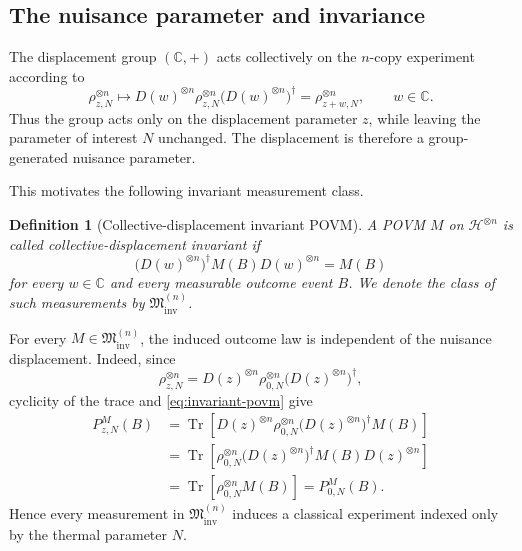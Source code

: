 \documentclass{article}
\newtheorem{definition}{Definition}
\theoremstyle{named}
\theoremstyle{named1}
\newcommand{\Tr}{\operatorname{Tr}}
\newcommand{\bbC}{\mathbb C}
\newcommand{\cM}{\mathfrak M}
\newcommand{\cH}{\mathcal H}
\theoremstyle{plain}
\theoremstyle{remark}
\begin{document}
\subsection{The nuisance parameter and invariance}
\label{subsec:gaussian-symmetry}

The displacement group $(\bbC,+)$ acts collectively on the $n$-copy
experiment according to
\begin{equation}
    \rho_{z,N}^{\otimes n}
    \longmapsto
    D(w)^{\otimes n}
    \rho_{z,N}^{\otimes n}
    \bigl(D(w)^{\otimes n}\bigr)^\dagger
    =
    \rho_{z+w,N}^{\otimes n},
    \qquad
    w\in\bbC.
    \label{eq:collective-displacement-action}
\end{equation}
Thus the group acts only on the displacement parameter $z$, while leaving
the parameter of interest $N$ unchanged. The displacement is therefore a
group-generated nuisance parameter.

This motivates the following invariant measurement class.

\begin{definition}[Collective-displacement invariant POVM]
\label{def:collective-displacement-invariant}
A POVM $M$ on $\cH^{\otimes n}$ is called
\emph{collective-displacement invariant} if
\begin{equation}
    \bigl(D(w)^{\otimes n}\bigr)^\dagger
    M(B)
    D(w)^{\otimes n}
    =
    M(B)
    \label{eq:invariant-povm}
\end{equation}
for every $w\in\bbC$ and every measurable outcome event $B$.
We denote the class of such measurements by
$\cM_{\mathrm{inv}}^{(n)}$.
\end{definition}

For every $M\in\cM_{\mathrm{inv}}^{(n)}$, the induced outcome law is
independent of the nuisance displacement. Indeed, since
\[
    \rho_{z,N}^{\otimes n}
    =
    D(z)^{\otimes n}
    \rho_{0,N}^{\otimes n}
    \bigl(D(z)^{\otimes n}\bigr)^\dagger,
\]
cyclicity of the trace and \eqref{eq:invariant-povm} give
\begin{align}
    P_{z,N}^{M}(B)
    &=
    \Tr\!\left[
        D(z)^{\otimes n}
        \rho_{0,N}^{\otimes n}
        \bigl(D(z)^{\otimes n}\bigr)^\dagger
        M(B)
    \right]
    \nonumber\\
    &=
    \Tr\!\left[
        \rho_{0,N}^{\otimes n}
        \bigl(D(z)^{\otimes n}\bigr)^\dagger
        M(B)
        D(z)^{\otimes n}
    \right]
    \nonumber\\
    &=
    \Tr\!\left[
        \rho_{0,N}^{\otimes n}M(B)
    \right]
    =
    P_{0,N}^{M}(B).
    \label{eq:invariant-law-independent-z}
\end{align}
Hence every measurement in $\cM_{\mathrm{inv}}^{(n)}$ induces a classical
experiment indexed only by the thermal parameter $N$.
\end{document}
